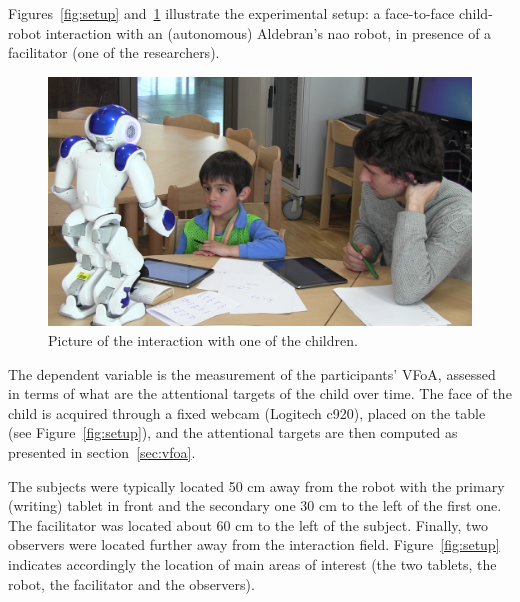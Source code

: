 \documentclass{sig-alternate}
\begin{document}
Figures~\ref{fig:setup} and~\ref{fig:realSetup} illustrate the experimental setup: a face-to-face
child-robot interaction with an (autonomous) Aldebran's {\sc nao} robot, in
presence of a facilitator (one of the researchers).

\begin{figure}[h!]
    \centering
    \includegraphics[width=1\columnwidth]{realSetup}
    \caption{\small Picture of the interaction with one of the children.}
    \label{fig:realSetup}
\end{figure}


The dependent variable is the measurement of the participants' VFoA, assessed in
terms of what are the attentional targets of the child over time. The face of the child
is acquired through a fixed webcam (Logitech {\sf c920}), placed on the table
(see Figure~\ref{fig:setup}), and the attentional targets are then computed as
presented in section~\ref{sec:vfoa}.


The subjects were typically located 50 cm away from the robot with the primary
(writing) tablet in front and the secondary one 30 cm to the left of the first
one.  The facilitator was located about 60 cm to the left of the subject.
Finally, two observers were located further away from the interaction field.
Figure~\ref{fig:setup} indicates accordingly the location of main areas of
interest (the two tablets, the robot, the facilitator and the observers).
\end{document}
